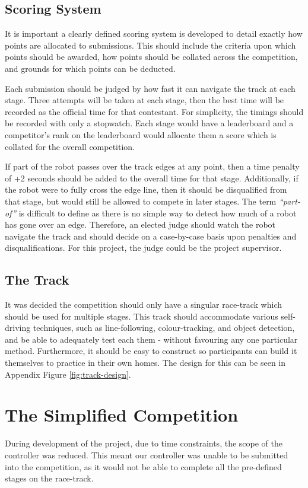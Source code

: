 \documentclass{l4proj}
\begin{document}
\subsection{Scoring System}
It is important a clearly defined scoring system is developed to detail exactly how points are allocated to submissions. This should include the criteria upon which points should be awarded, how points should be collated across the competition, and grounds for which points can be deducted.

Each submission should be judged by how fast it can navigate the track at each stage. Three attempts will be taken at each stage, then the best time will be recorded as the official time for that contestant. For simplicity, the timings should be recorded with only a stopwatch. Each stage would have a leaderboard and a competitor's rank on the leaderboard would allocate them a score which is collated for the overall competition.

If part of the robot passes over the track edges at any point, then a time penalty of +2 seconds should be added to the overall time for that stage. Additionally, if the robot were to fully cross the edge line, then it should be disqualified from that stage, but would still be allowed to compete in later stages. The term \textit{“part-of”} is difficult to define as there is no simple way to detect how much of a robot has gone over an edge. Therefore, an elected judge should watch the robot navigate the track and should decide on a case-by-case basis upon penalties and disqualifications. For this project, the judge could be the project supervisor.

\subsection{The Track}
It was decided the competition should only have a singular race-track which should be used for multiple stages. This track should accommodate various self-driving techniques, such as line-following, colour-tracking, and object detection, and be able to adequately test each them - without favouring any one particular method. Furthermore, it should be easy to construct so participants can build it themselves to practice in their own homes. The design for this can be seen in Appendix Figure \ref{fig:track-design}.


\section{The Simplified Competition}\label{sec:simplified-comp}
During development of the project, due to time constraints, the scope of the controller was reduced. This meant our controller was unable to be submitted into the competition, as it would not be able to complete all the pre-defined stages on the race-track.
\end{document}
